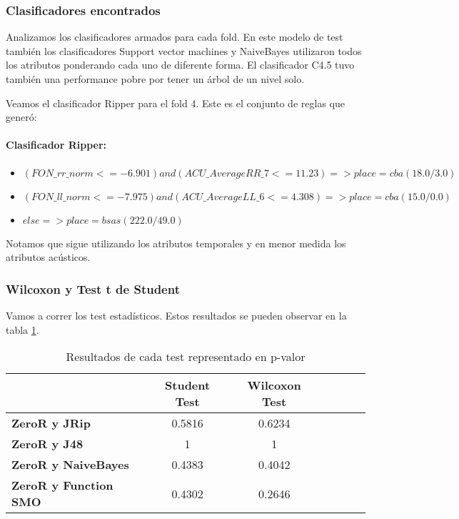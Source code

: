 \subsubsection{Clasificadores encontrados}

Analizamos los clasificadores armados para cada fold. En este modelo de test también los clasificadores Support vector machines y NaiveBayes utilizaron todos los atributos ponderando cada uno de diferente forma. El clasificador C4.5 tuvo también una performance pobre por tener un árbol de un nivel solo. 

Veamos el clasificador Ripper para el fold 4. Este es el conjunto de reglas que generó:
\paragraph*{Clasificador Ripper:}
\begin{flushleft}
	\begin{itemize}
		\item $(FON\_rr\_norm <= -6.901) and (ACU\_AverageRR\_7 <= 11.23) => place=cba (18.0/3.0)$ \\
		\item $(FON\_ll\_norm <= -7.975) and (ACU\_AverageLL\_6 <= 4.308) => place=cba (15.0/0.0)$
		\item $else => place=bsas (222.0/49.0)$
	\end{itemize}
\end{flushleft}

Notamos que sigue utilizando los atributos temporales y en menor medida los atributos acústicos.


\subsubsection{Wilcoxon y Test t de Student}

Vamos a correr los test estadísticos. Estos resultados se pueden observar en la tabla  \ref{res_tests_wilcoxon_student}.

\begin{table}[H]
	\centering
	\begin{tabular}{|l|c|c|c|c|c|c|}
		\hline
		\textbf{}  & \textbf{Student Test} & \textbf{Wilcoxon Test} \\ \hline
		\textbf{ZeroR y JRip}  & 0.5816 & 0.6234 \\ \hline
		\textbf{ZeroR y J48}  & 1 & 1 \\ \hline
		\textbf{ZeroR y NaiveBayes}  & 0.4383 & 0.4042 \\ \hline
		\textbf{ZeroR y Function SMO}  & 0.4302 & 0.2646 \\ \hline
	\end{tabular}
	\caption{Resultados de cada test representado en p-valor}
	\label{res_tests_wilcoxon_student}
\end{table}

